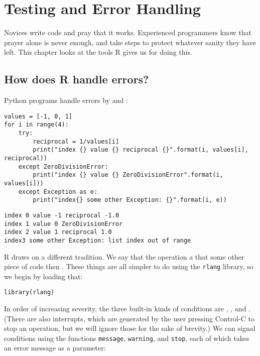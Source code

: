 \chapter{Testing and Error Handling}\label{testerror}

Novices write code and pray that it works.
Experienced programmers know that prayer alone is never enough,
and take steps to protect whatever sanity they have left.
This chapter looks at the tools R gives us for doing this.

\section{How does R handle errors?}

Python programs handle errors
by  and  :

\begin{lstlisting}
values = [-1, 0, 1]
for i in range(4):
    try:
        reciprocal = 1/values[i]
        print("index {} value {} reciprocal {}".format(i, values[i], reciprocal))
    except ZeroDivisionError:
        print("index {} value {} ZeroDivisionError".format(i, values[i]))
    except Exception as e:
        print("index{} some other Exception: {}".format(i, e))
\end{lstlisting}

\begin{lstlisting}
index 0 value -1 reciprocal -1.0
index 1 value 0 ZeroDivisionError
index 2 value 1 reciprocal 1.0
index3 some other Exception: list index out of range
\end{lstlisting}

R draws on a different tradition.
We say that the operation  a 
that some other piece of code then .
These things are all simpler to do using the \texttt{rlang} library,
so we begin by loading that:

\begin{lstlisting}
library(rlang)
\end{lstlisting}

In order of increasing severity,
the three built-in kinds of conditions are ,
,
and .
(There are also interrupts,
which are generated by the user pressing Control-C to stop an operation,
but we will ignore those for the sake of brevity.)
We can signal conditions using the functions \texttt{message}, \texttt{warning}, and \texttt{stop},
each of which takes an error message as a parameter:

